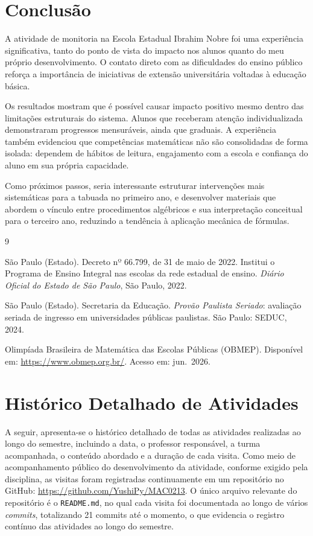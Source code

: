 \documentclass[11pt]{article}
\begin{document}
\section{Conclusão}

A atividade de monitoria na Escola Estadual Ibrahim Nobre foi uma experiência significativa, tanto do ponto de vista do impacto nos alunos quanto do meu próprio desenvolvimento. O contato direto com as dificuldades do ensino público reforça a importância de iniciativas de extensão universitária voltadas à educação básica.

Os resultados mostram que é possível causar impacto positivo mesmo dentro das limitações estruturais do sistema. Alunos que receberam atenção individualizada demonstraram progressos mensuráveis, ainda que graduais. A experiência também evidenciou que competências matemáticas não são consolidadas de forma isolada: dependem de hábitos de leitura, engajamento com a escola e confiança do aluno em sua própria capacidade.

Como próximos passos, seria interessante estruturar intervenções mais sistemáticas para a tabuada no primeiro ano, e desenvolver materiais que abordem o vínculo entre procedimentos algébricos e sua interpretação conceitual para o terceiro ano, reduzindo a tendência à aplicação mecânica de fórmulas.

\begin{thebibliography}{9}

São Paulo (Estado). Decreto nº 66.799, de 31 de maio de 2022. Institui o Programa de Ensino Integral nas escolas da rede estadual de ensino. \emph{Diário Oficial do Estado de São Paulo}, São Paulo, 2022.

São Paulo (Estado). Secretaria da Educação. \emph{Provão Paulista Seriado}: avaliação seriada de ingresso em universidades públicas paulistas. São Paulo: SEDUC, 2024.

Olimpíada Brasileira de Matemática das Escolas Públicas (OBMEP). Disponível em: \url{https://www.obmep.org.br/}. Acesso em: jun.\ 2026.

\end{thebibliography}

\section*{Histórico Detalhado de Atividades}

A seguir, apresenta-se o histórico detalhado de todas as atividades realizadas ao longo do semestre, incluindo a data, o professor responsável, a turma acompanhada, o conteúdo abordado e a duração de cada visita. Como meio de acompanhamento público do desenvolvimento da atividade, conforme exigido pela disciplina, as visitas foram registradas continuamente em um repositório no GitHub: \url{https://github.com/YushiPy/MAC0213}. O único arquivo relevante do repositório é o \texttt{README.md}, no qual cada visita foi documentada ao longo de vários \textit{commits}, totalizando 21 commits até o momento, o que evidencia o registro contínuo das atividades ao longo do semestre.
\end{document}

